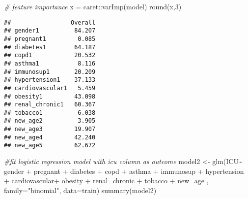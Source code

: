 \documentclass[
]{article}
\newenvironment{Shaded}{\begin{snugshade}}{\end{snugshade}}
\newcommand{\AttributeTok}[1]{\textcolor[rgb]{0.77,0.63,0.00}{#1}}
\newcommand{\CommentTok}[1]{\textcolor[rgb]{0.56,0.35,0.01}{\textit{#1}}}
\newcommand{\DecValTok}[1]{\textcolor[rgb]{0.00,0.00,0.81}{#1}}
\newcommand{\FunctionTok}[1]{\textcolor[rgb]{0.00,0.00,0.00}{#1}}
\newcommand{\NormalTok}[1]{#1}
\newcommand{\OtherTok}[1]{\textcolor[rgb]{0.56,0.35,0.01}{#1}}
\newcommand{\SpecialCharTok}[1]{\textcolor[rgb]{0.00,0.00,0.00}{#1}}
\newcommand{\StringTok}[1]{\textcolor[rgb]{0.31,0.60,0.02}{#1}}
\begin{document}
\begin{Shaded}
\begin{Highlighting}[]
\CommentTok{\# feature importance}
\NormalTok{x }\OtherTok{=}\NormalTok{ caret}\SpecialCharTok{::}\FunctionTok{varImp}\NormalTok{(model)}
\FunctionTok{round}\NormalTok{(x,}\DecValTok{3}\NormalTok{)}
\end{Highlighting}
\end{Shaded}

\begin{verbatim}
##                 Overall
## gender1          84.207
## pregnant1         0.085
## diabetes1        64.187
## copd1            20.532
## asthma1           8.116
## immunosup1       20.209
## hypertension1    37.133
## cardiovascular1   5.459
## obesity1         43.098
## renal_chronic1   60.367
## tobacco1          6.038
## new_age2          3.905
## new_age3         19.907
## new_age4         42.240
## new_age5         62.672
\end{verbatim}

\begin{Shaded}
\begin{Highlighting}[]
\CommentTok{\#fit logistic regression model with icu column as outcome}
\NormalTok{model2 }\OtherTok{\textless{}{-}} \FunctionTok{glm}\NormalTok{(ICU}\SpecialCharTok{\textasciitilde{}}\NormalTok{ gender }\SpecialCharTok{+}\NormalTok{ pregnant }\SpecialCharTok{+}\NormalTok{ diabetes }\SpecialCharTok{+}\NormalTok{ copd }\SpecialCharTok{+}\NormalTok{ asthma }\SpecialCharTok{+}\NormalTok{ immunosup }\SpecialCharTok{+}\NormalTok{ hypertension }\SpecialCharTok{+}\NormalTok{ cardiovascular}\SpecialCharTok{+} 
\NormalTok{               obesity }\SpecialCharTok{+}\NormalTok{ renal\_chronic }\SpecialCharTok{+}\NormalTok{ tobacco  }\SpecialCharTok{+}\NormalTok{ new\_age , }\AttributeTok{family=}\StringTok{"binomial"}\NormalTok{, }\AttributeTok{data=}\NormalTok{train)}
\FunctionTok{summary}\NormalTok{(model2)}
\end{Highlighting}
\end{Shaded}
\end{document}
